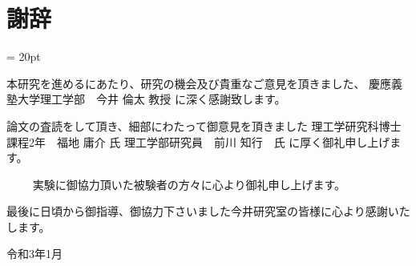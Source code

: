 %
%
\chapter*{謝辞}
\baselineskip = 20pt

\begin{verbatimtab}
	本研究を進めるにあたり、研究の機会及び貴重なご意見を頂きました、
			慶應義塾大学理工学部　今井 倫太 教授
に深く感謝致します。


	論文の査読をして頂き、細部にわたって御意見を頂きました
			理工学研究科博士課程2年　福地 庸介 氏
			理工学部研究員　前川 知行　氏
に厚く御礼申し上げます。

　　
	実験に御協力頂いた被験者の方々に心より御礼申し上げます。



最後に日頃から御指導、御協力下さいました今井研究室の皆様に心より感謝いたします。


							令和3年1月
\end{verbatimtab}




% 　　





